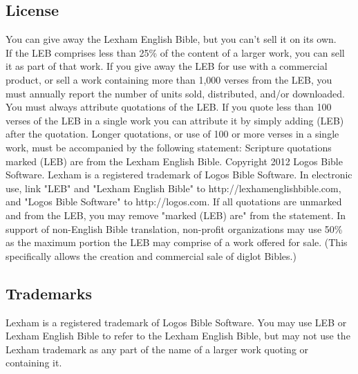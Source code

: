 \subsection*{License}
You can give away the Lexham English Bible, but you can't sell it on its own.\\
If the LEB comprises less than 25\% of the 
content of a larger work, you can sell it as part of that work.
If you give away the LEB for use with a commercial product, or sell a work containing more than 1,000 verses from the LEB, 
you must annually report the number of units sold, distributed, and/or downloaded.
You must always attribute quotations of the LEB.
If you quote less than 100 verses of the LEB in a single work you can attribute it by simply adding (LEB) after the quotation. 
Longer quotations, or use of 100 or more verses in a single work, must be accompanied by the following statement:
Scripture quotations marked (LEB) are from the Lexham English Bible. Copyright 2012 Logos Bible Software. Lexham is a 
registered trademark of Logos Bible Software.
In electronic use, link "LEB" and "Lexham English Bible" to http://lexhamenglishbible.com, and "Logos Bible Software" 
to http://logos.com. If all quotations are unmarked and from the LEB, you may remove "marked (LEB) are" from the statement.
In support of non-English Bible translation, non-profit organizations may use 50\% as the maximum portion the LEB may 
comprise of a work offered for sale. (This specifically allows the creation and commercial sale of diglot Bibles.)


\subsection*{Trademarks}
Lexham is a registered trademark of Logos Bible Software. You may use LEB or Lexham English Bible to refer to the 
Lexham English Bible, but may not use the Lexham trademark as any part of the name of a larger work quoting or containing it.

\vfill
{}


\endgroup



\clearpage
\twocolumn
\justify
\thispagestyle{empty}
\mbox{}








